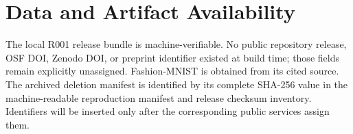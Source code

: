 \section{Data and Artifact Availability}
The local R001 release bundle is machine-verifiable. No public repository release, OSF DOI,
Zenodo DOI, or preprint identifier existed at build time; those fields remain explicitly
unassigned. Fashion-MNIST is obtained from its cited source. The archived deletion manifest
is identified by its complete SHA-256 value in the machine-readable reproduction manifest
and release checksum inventory. Identifiers will be inserted only after the corresponding
public services assign them.
